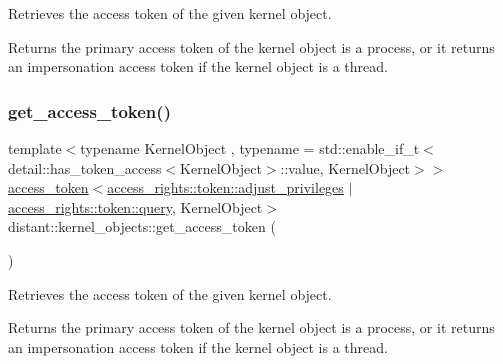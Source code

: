 Retrieves the access token of the given kernel object. 

\begin{DoxyReturn}{Returns}
the primary access token of the kernel object is a process, or it returns an impersonation access token if the kernel object is a thread. 
\end{DoxyReturn}
\mbox{\label{namespacedistant_1_1kernel__objects_a183f62d57b0b3641d56100f0483242f7}} 
\subsubsection{\texorpdfstring{get\+\_\+access\+\_\+token()}{get\_access\_token()}\hspace{0.1cm}{\footnotesize\ttfamily [2/4]}}
{\footnotesize\ttfamily template$<$typename Kernel\+Object , typename  = std\+::enable\+\_\+if\+\_\+t$<$detail\+::has\+\_\+token\+\_\+access$<$\+Kernel\+Object$>$\+::value, Kernel\+Object$>$$>$ \\
\mbox{\hyperlink{classdistant_1_1kernel__objects_1_1access__token}{access\+\_\+token}}$<$\mbox{\hyperlink{structdistant_1_1access__rights_a6b4d9e837868c8c15cf407e4c80d7f3ca59c6fe46f212dd4d2514e1777e707c98}{access\+\_\+rights\+::token\+::adjust\+\_\+privileges}} $\vert$ \mbox{\hyperlink{structdistant_1_1access__rights_a6b4d9e837868c8c15cf407e4c80d7f3ca1b1cc7f086b3f074da452bc3129981eb}{access\+\_\+rights\+::token\+::query}}, Kernel\+Object$>$ distant\+::kernel\+\_\+objects\+::get\+\_\+access\+\_\+token (\begin{DoxyParamCaption}\item[{const Kernel\+Object \&}]{ }\end{DoxyParamCaption})\hspace{0.3cm}{\ttfamily [noexcept]}}



Retrieves the access token of the given kernel object. 

\begin{DoxyReturn}{Returns}
the primary access token of the kernel object is a process, or it returns an impersonation access token if the kernel object is a thread. 
\end{DoxyReturn}
\mbox{\label{namespacedistant_1_1kernel__objects_a1e4c8c67d58793b7290c032e8e882aa1}} 
